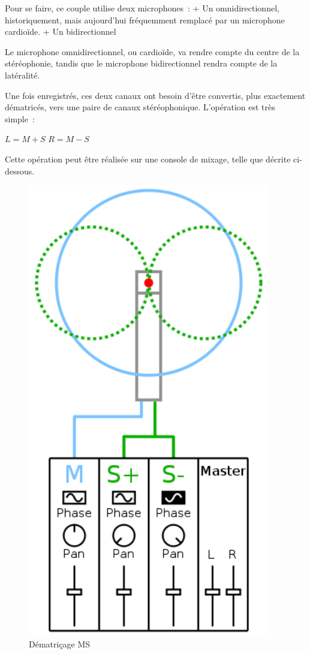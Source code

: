 \documentclass[
]{book}
\begin{document}
Pour se faire, ce couple utilise deux microphones~:
+ Un omnidirectionnel, historiquement, mais aujourd'hui fréquemment remplacé par un microphone cardioïde.
+ Un bidirectionnel

Le microphone omnidirectionnel, ou cardioïde, va rendre compte du centre de la stéréophonie, tandis que le microphone bidirectionnel rendra compte de la latéralité.

Une fois enregistrés, ces deux canaux ont besoin d'être convertis, plus exactement dématricés, vers une paire de canaux stéréophonique. L'opération est très simple~:

\(L = M+S\)
\(R = M-S\)

Cette opération peut être réalisée sur une console de mixage, telle que décrite ci-dessous.

\begin{figure}
\includegraphics[width=4.17in]{_resources/171f157be4749ac8446dd9bdfff0625b} \caption{Dématriçage MS}\label{fig:chunk-label}
\end{figure}
\end{document}
